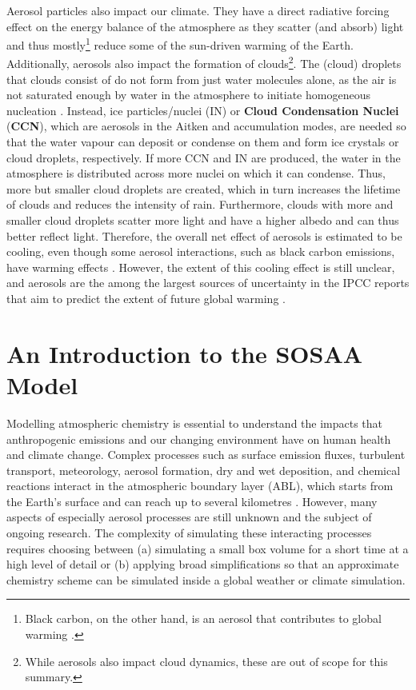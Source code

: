 \noindent Aerosol particles also impact our climate. They have a direct radiative forcing effect on the energy balance of the atmosphere as they scatter (and absorb) light and thus mostly\footnote{Black carbon, on the other hand, is an aerosol that contributes to global warming \cite{ipcc-6-summary-2021}.} reduce some of the sun-driven warming of the Earth. Additionally, aerosols also impact the formation of clouds\footnote{While aerosols also impact cloud dynamics, these are out of scope for this summary.}. The (cloud) droplets that clouds consist of do not form from just water molecules alone, as the air is not saturated enough by water in the atmosphere to initiate homogeneous nucleation \cite{ccn-1999}. Instead, ice particles/nuclei (IN) or \textbf{Cloud Condensation Nuclei} (\textbf{CCN}), which are aerosols in the Aitken and accumulation modes, are needed so that the water vapour can deposit or condense on them and form ice crystals or cloud droplets, respectively. If more CCN and IN are produced, the water in the atmosphere is distributed across more nuclei on which it can condense. Thus, more but smaller cloud droplets are created, which in turn increases the lifetime of clouds and reduces the intensity of rain. Furthermore, clouds with more and smaller cloud droplets scatter more light and have a higher albedo and can thus better reflect light. Therefore, the overall net effect of aerosols is estimated to be cooling, even though some aerosol interactions, such as black carbon emissions, have warming effects \cite{ipcc-6-summary-2021}. However, the extent of this cooling effect is still unclear, and aerosols are the among the largest sources of uncertainty in the IPCC reports that aim to predict the extent of future global warming \cite{ipcc-6-summary-2021}.

\section{An Introduction to the SOSAA Model} \label{txt:sosaa-model}

Modelling atmospheric chemistry is essential to understand the impacts that anthropogenic emissions and our changing environment have on human health and climate change. Complex processes such as surface emission fluxes, turbulent transport, meteorology, aerosol formation, dry and wet deposition, and chemical reactions interact in the atmospheric boundary layer (ABL), which starts from the Earth's surface and can reach up to several kilometres \cite{sosa-description-2011}. However, many aspects of especially aerosol processes are still unknown and the subject of ongoing research. The complexity of simulating these interacting processes requires choosing between (a) simulating a small box volume for a short time at a high level of detail or (b) applying broad simplifications so that an approximate chemistry scheme can be simulated inside a global weather or climate simulation.

